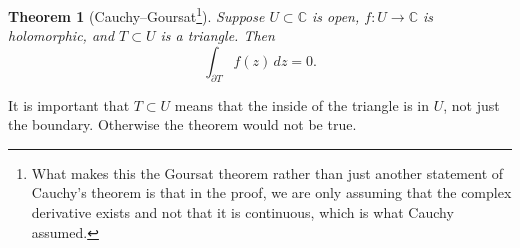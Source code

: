 \documentclass[12pt,openany]{book}
\newcommand{\C}{{\mathbb{C}}}
\theoremstyle{plain}
\newtheorem{thm}{Theorem}[section]
\theoremstyle{remark}
\theoremstyle{definition}
\theoremstyle{exercise}
\theoremstyle{example}
\begin{document}
\begin{thm}[Cauchy--Goursat\footnote{%
What makes this the Goursat theorem
rather than just another statement of Cauchy's theorem
is that in the proof, we are only assuming that the complex derivative exists
and not that it is continuous, which is what Cauchy assumed.}]
Suppose $U \subset \C$ is open, $f \colon U \to \C$ is
holomorphic,
and $T \subset U$ is a triangle.  Then
\begin{equation*}
\int_{\partial T} f(z) \, dz = 0 .
\end{equation*}
\end{thm}

It is important that $T \subset U$ means that the inside
of the triangle is in $U$, not just the boundary.  Otherwise the theorem
would not be true.
\end{document}
